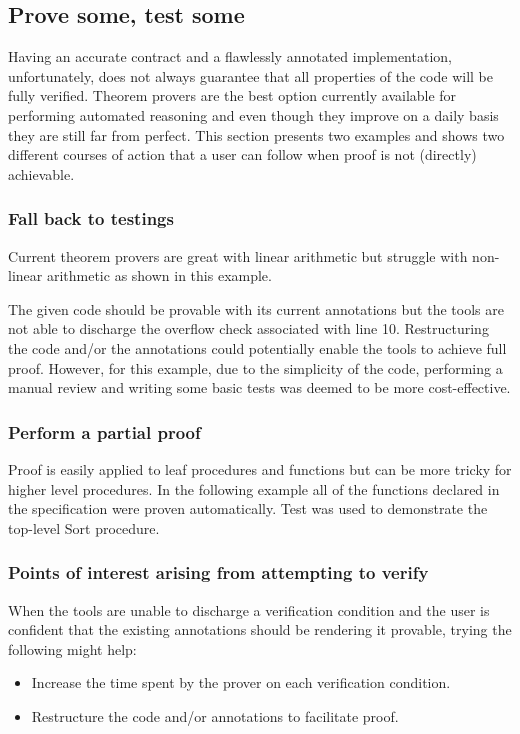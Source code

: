 \documentclass{llncs}
\begin{document}
\subsection{Prove some, test some}
Having an accurate contract and a flawlessly annotated implementation,
unfortunately, does not always guarantee that all properties of the
code will be fully verified.  Theorem provers are the best option
currently available for performing automated reasoning and even though
they improve on a daily basis they are still far from perfect.  This
section presents two examples and shows two different courses of
action that a user can follow when proof is not (directly) achievable.

\subsubsection{Fall back to testings}
Current theorem provers are great with linear arithmetic but struggle
with non-linear arithmetic as shown in this example.

 The given code
should be provable with its current annotations but the tools are not
able to discharge the overflow check associated with line
10. Restructuring the code and/or the annotations could potentially
enable the tools to achieve full proof. However, for this example, due
to the simplicity of the code, performing a manual review and writing
some basic tests was deemed to be more cost-effective.

\subsubsection{Perform a partial proof}
Proof is easily applied to leaf procedures and functions but can be
more tricky for higher level procedures. In the following example all
of the functions declared in the specification were proven
automatically. Test was used to demonstrate the top-level Sort
procedure.



\subsubsection{Points of interest arising from attempting to verify}
When the tools are unable to discharge a verification condition and
the user is confident that the existing annotations should be
rendering it provable, trying the following might help:
\begin{itemize}
\item Increase the time spent by the prover on each verification
  condition.
\item Restructure the code and/or annotations to facilitate proof.
\end{itemize}
\end{document}
